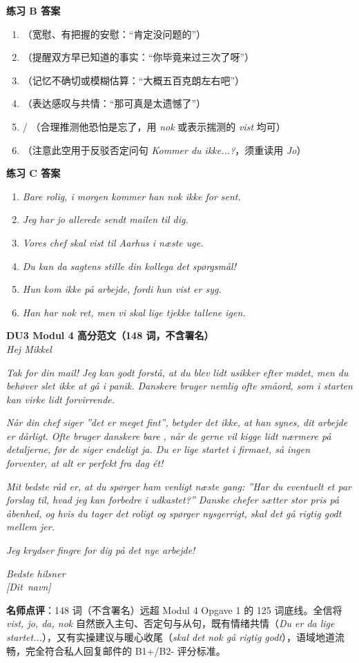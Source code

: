 \begin{answerbox}
\textbf{练习 B 答案}
\begin{enumerate}
  \item {}（宽慰、有把握的安慰：“肯定没问题的”）
  \item {}（提醒双方早已知道的事实：“你毕竟来过三次了呀”）
  \item {}（记忆不确切或模糊估算：“大概五百克朗左右吧”）
  \item {}（表达感叹与共情：“那可真是太遗憾了”）
  \item {} / （合理推测他恐怕是忘了，用 \textit{nok} 或表示揣测的 \textit{vist} 均可）
  \item {}（注意此空用于反驳否定问句 \textit{Kommer du ikke...?}，须重读用 \textit{Jo}）
\end{enumerate}

\textbf{练习 C 答案}
\begin{enumerate}
  \item \textit{Bare rolig, i morgen kommer han nok ikke for sent.}
  \item \textit{Jeg har jo allerede sendt mailen til dig.}
  \item \textit{Vores chef skal vist til Aarhus i næste uge.}
  \item \textit{Du kan da sagtens stille din kollega det spørgsmål!}
  \item \textit{Hun kom ikke på arbejde, fordi hun vist er syg.}
  \item \textit{Han har nok ret, men vi skal lige tjekke tallene igen.}
\end{enumerate}

\textbf{DU3 Modul 4 高分范文（148 词，不含署名）}\\
\textit{Hej Mikkel}

\textit{Tak for din mail! Jeg kan godt forstå, at du blev lidt usikker efter mødet, men du behøver slet ikke at gå i panik. Danskere bruger nemlig ofte småord, som i starten kan virke lidt forvirrende.}

\textit{Når din chef siger ”det er  meget fint”, betyder det  ikke, at han synes, dit arbejde er dårligt. Ofte bruger danskere bare , når de gerne vil kigge lidt nærmere på detaljerne, før de siger endeligt ja. Du er  lige startet i firmaet, så ingen forventer, at alt er perfekt fra dag ét!}

\textit{Mit bedste råd er, at du spørger ham venligt næste gang: ”Har du eventuelt et par forslag til, hvad jeg kan forbedre i udkastet?” Danske chefer sætter  stor pris på åbenhed, og hvis du tager det roligt og spørger nysgerrigt, skal det  gå rigtig godt mellem jer.}

\textit{Jeg krydser fingre for dig på det nye arbejde!}

\textit{Bedste hilsner\\
\mbox{[Dit navn]}}

\small\textbf{名师点评}：148 词（不含署名）远超 Modul 4 Opgave 1 的 125 词底线。全信将 \textit{vist, jo, da, nok} 自然嵌入主句、否定句与从句，既有情绪共情（\textit{Du er da lige startet...}），又有实操建议与暖心收尾（\textit{skal det nok gå rigtig godt}），语域地道流畅，完全符合私人回复邮件的 B1+/B2- 评分标准。
\end{answerbox}